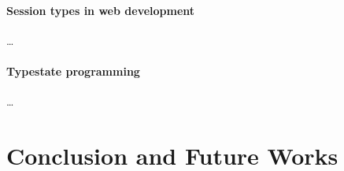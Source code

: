 \documentclass[submission,copyright,creativecommons]{eptcs}
\begin{document}

\paragraph{Session types in web development} \dots

\paragraph{Typestate programming} \dots

\section{Conclusion and Future Works}

\end{document}

